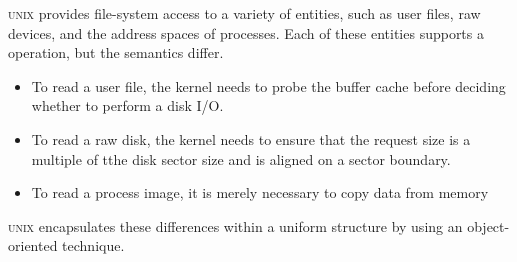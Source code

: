 \textsc{unix} provides file-system access to a variety of entities, such as user files, raw devices, and the address spaces of processes.
Each of these entities supports a  operation, but the semantics differ.
\begin{itemize}[noitemsep]
\item To read a user file, the kernel needs to probe the buffer cache before deciding whether to perform a disk I/O.
\item To read a raw disk, the kernel needs to ensure that the request size is a multiple of tthe disk sector size and is aligned on a sector boundary.
\item To read a process image, it is merely necessary to copy data from memory
\end{itemize}

\textsc{unix} encapsulates these differences within a uniform structure by using an object-oriented technique.


